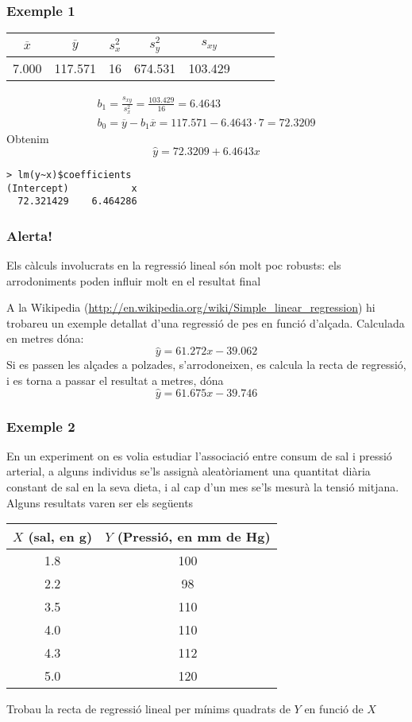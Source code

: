 \documentclass[12pt,t]{beamer}
\theoremstyle{plain}
\theoremstyle{definition}
\begin{document}
\begin{frame}[fragile]
\frametitle{Exemple 1}
\vspace*{-2ex}

\begin{center}
\begin{tabular}{cccccccc}
$\overline{x}$ &  $\overline{y}$ & $s_x^2$ & $s_y^2$ & $s_{xy}$\\ \hline
7.000 & 117.571 & 16 & 674.531 & 103.429
\end{tabular}
\end{center}
$$
\begin{array}{l}
\displaystyle b_1 =\frac{s_{xy}}{s_x^2}=\frac{103.429}{16}=6.4643\\[2ex]
\displaystyle b_0 = \overline{y}-b_1 \overline{x} =117.571-6.4643\cdot 7=72.3209
\end{array}
$$
Obtenim
$$
\widehat{y}=72.3209+6.4643x
$$
\medskip

\begin{verbatim}
> lm(y~x)$coefficients
(Intercept)           x 
  72.321429    6.464286 
\end{verbatim}
\end{frame}

\begin{frame}[fragile]
\frametitle{Alerta!}

Els càlculs involucrats en la regressió lineal són molt poc robusts: els arrodoniments
poden influir molt en el resultat final
\bigskip

A la Wikipedia (\url{http://en.wikipedia.org/wiki/Simple_linear_regression}) hi trobareu un exemple detallat d'una regressió de pes en funció d'alçada. Calculada en metres dóna:
$$
\widehat{y}=61.272x-39.062
$$
Si es passen les alçades a polzades, s'arrodoneixen, es calcula la recta de regressió, i es torna a passar  el resultat a metres, dóna
$$
\widehat{y}=61.675x-39.746
$$




\end{frame}



\begin{frame}
\frametitle{Exemple 2}
En un experiment on es volia estudiar l'associació entre consum de sal i pressió arterial, a alguns individus se'ls assignà aleatòriament una quantitat diària constant de sal en la seva dieta, i al cap d'un mes se'ls mesurà la tensió mitjana. Alguns resultats varen ser els següents
\begin{center}
\begin{tabular}{cc}
$X$ (sal, en g) 	& $Y$ (Pressió, en mm de Hg)\\ \hline
1.8 &	100\\
2.2 &	98\\
3.5 &	110\\
4.0 &	110\\
4.3 &	112\\
5.0 &	120\\
\end{tabular}
\end{center}
Trobau la recta de regressió lineal per mínims quadrats de $Y$ en funció de $X$

\end{frame}
\end{document}
